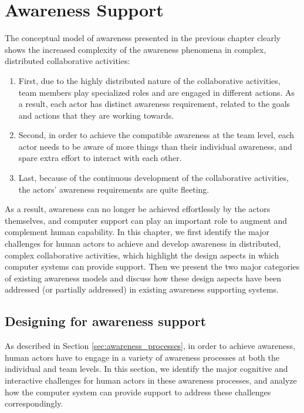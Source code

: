 \graphicspath{{Figures/}}

\chapter{Awareness Support} %
\label{cha:awareness_support}
The conceptual model of awareness presented in the previous chapter clearly shows the increased complexity of the awareness phenomena in complex, distributed collaborative activities:

\begin{enumerate}
   \item First, due to the highly distributed nature of the collaborative activities, team members play specialized roles and are engaged in different actions. As a result, each actor has distinct awareness requirement, related to the goals and actions that they are working towards.
   \item Second, in order to achieve the compatible awareness at the team level, each actor needs to be aware of more things than their individual awareness, and spare extra effort to interact with each other.
   \item Last, because of the continuous development of the collaborative activities, the actors' awareness requirements are quite fleeting.
\end{enumerate}

As a result, awareness can no longer be achieved effortlessly by the actors themselves, and computer support can play an important role to augment and complement human capability. In this chapter, we first identify the major challenges for human actors to achieve and develop awareness in distributed, complex collaborative activities, which highlight the design aspects in which computer systems can provide support. Then we present the two major categories of existing awareness models and discuss how these design aspects have been addressed (or partially addressed) in existing awareness supporting systems.

\section{Designing for awareness support} %
\label{sec:designing_for_awareness_support}
As described in Section \ref{sec:awareness_processes}, in order to achieve awareness, human actors have to engage in a variety of awareness processes at both the individual and team levels. In this section, we identify the major cognitive and interactive challenges for human actors in these awareness processes, and analyze how the computer system can provide support to address these challenges correspondingly.

